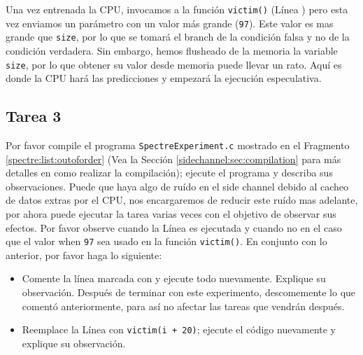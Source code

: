 Una vez entrenada la CPU, invocamos a la función \texttt{victim()} (Línea ) pero esta vez enviamos un parámetro con un valor más grande (\texttt{97}). Este valor es mas grande que \texttt{size}, por lo que se tomará el branch de la condición falsa y no de la condición verdadera. Sin embargo, hemos flusheado de la memoria la variable \texttt{size}, por lo que obtener su valor desde memoria puede llevar un rato. Aquí es donde la CPU hará las predicciones y empezará la ejecución especulativa.



\subsection{Tarea 3} 

Por favor compile el programa \texttt{SpectreExperiment.c} mostrado en el Fragmento \ref{spectre:list:outoforder}  (Vea la Sección \ref{sidechannel:sec:compilation} para más detalles en como realizar la compilación); ejecute el programa y describa sus observaciones. Puede que haya algo de ruído en el side channel debido al cacheo de datos extras por el CPU, nos encargaremos de reducir este ruído mas adelante, por ahora puede ejecutar la tarea varias veces con el objetivo de observar sus efectos. Por favor observe cuando la Línea  es ejecutada y cuando no en el caso que el valor when \texttt{97} sea usado en la función \texttt{victim()}. 
En conjunto con lo anterior, por favor haga lo siguiente:


\begin{itemize}
\item Comente la línea marcada con  y ejecute todo nuevamente. Explique su observación. Después de terminar con este experimento, descomemente lo que comentó anteriormente, para así no afectar las tareas que vendrán después.

\item Reemplace la Línea  con \texttt{victim(i + 20)}; ejecute el código nuevamente y explique su observación.
\end{itemize}
 



